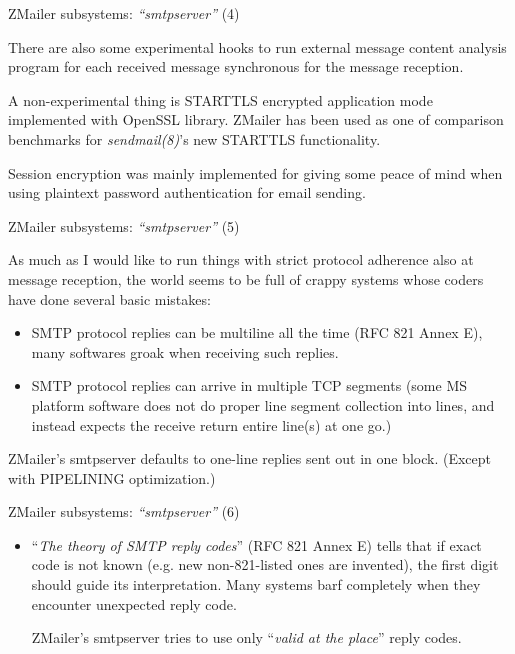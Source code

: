 \documentclass[a4paper,landscape]{slides}
\newcommand{\ZM}{ZMailer}
\begin{document}
\begin{slide}
\centerline{\large \ZM{} subsystems: {\em ``smtpserver''} (4)}

There are also some experimental hooks to run external message
content analysis program for each received message synchronous
for the message reception.

A non-experimental thing is STARTTLS encrypted application mode
implemented with OpenSSL library.  \ZM{} has been used as one of
comparison benchmarks for {\em sendmail(8)}'s new STARTTLS
functionality.

Session encryption was mainly implemented for giving
some peace of mind when using plaintext password authentication
for email sending.

\vfill
\end{slide}

\begin{slide}
\centerline{\large \ZM{} subsystems: {\em ``smtpserver''} (5)}

As much as I would like to run things with strict protocol adherence
also at message reception, the world seems to be full of crappy systems
whose coders have done several basic mistakes:
\begin{itemize}
\small
\item
SMTP protocol replies can be multiline all the time (RFC 821 Annex E),
many softwares groak when receiving such replies.
\item
 SMTP protocol replies can arrive in multiple TCP segments (some MS
platform software does not do proper line segment collection into lines,
and instead expects the receive return entire line(s) at one go.)
\end{itemize}
\ZM's smtpserver defaults to one-line replies sent out in one block.
(Except with PIPELINING optimization.)
\vfill
\end{slide}

\begin{slide}
\centerline{\large \ZM{} subsystems: {\em ``smtpserver''} (6)}
\begin{itemize}
\item
``{\em The theory of SMTP reply codes}'' (RFC 821 Annex E) tells
that if exact code is not known (e.g. new non-821-listed ones are invented),
the first digit should guide its interpretation.
Many systems barf completely when they encounter unexpected reply code.

\ZM{}'s smtpserver tries to use only ``{\em valid at the place}''
reply codes.
\end{itemize}

\vfill
\end{slide}
\end{document}
